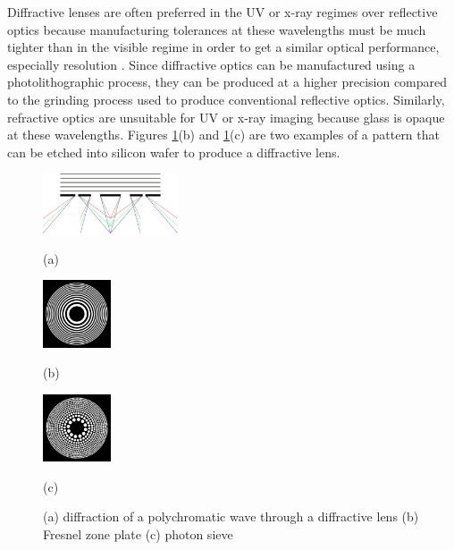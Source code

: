 \documentclass{article}
\begin{document}
Diffractive lenses are often preferred in the UV or x-ray
regimes over reflective optics because manufacturing tolerances at these
wavelengths must be much tighter than in the visible regime in order to get a
similar optical performance, especially resolution \cite{davila2011high}. Since
diffractive optics can be manufactured using a photolithographic process, they
can be produced at a higher precision compared to the grinding process used to
produce conventional reflective optics. Similarly, refractive optics are
unsuitable for UV or x-ray imaging because glass is opaque at these wavelengths.
Figures \ref{fig:diff_lens}(b) and \ref{fig:diff_lens}(c) are two examples of a
pattern that can be etched into silicon wafer to produce a diffractive lens.

\begin{figure}[htb]

\begin{minipage}[b]{0.48\linewidth}
  \centering
  \centerline{\includegraphics[width=4.0cm]{diffraction_ps_rgb}}
  \centerline{(a)}\medskip
\end{minipage}
\hfill
\begin{minipage}[b]{0.24\linewidth}
  \centering
  \centerline{\includegraphics[width=2.0cm]{zoneplate}}
  \centerline{(b)}\medskip
\end{minipage}
\hfill
\begin{minipage}[b]{0.24\linewidth}
  \centering
  \centerline{\includegraphics[width=2.0cm]{photonsieve}}
  \centerline{(c)}\medskip
\end{minipage}
\caption{(a) diffraction of a polychromatic wave through a diffractive lens (b) Fresnel zone
plate (c) photon sieve}
\label{fig:diff_lens}
%
\end{figure}
\end{document}
